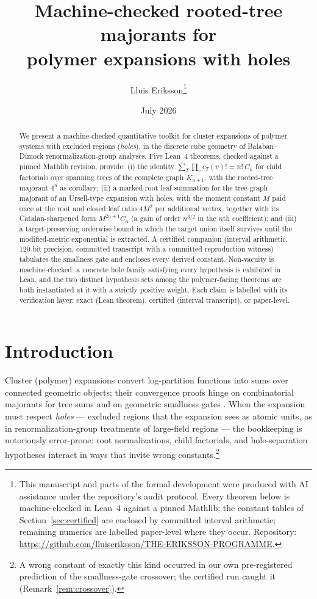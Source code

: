 \documentclass[11pt]{article}
\title{Machine-checked rooted-tree majorants for\\
polymer expansions with holes}
\author{Lluis Eriksson\thanks{This manuscript and parts of the
formal development were produced with AI assistance under the
repository's audit protocol.  Every theorem below is machine-checked
in Lean~4 against a pinned Mathlib; the constant tables of
Section~\ref{sec:certified} are enclosed by committed interval
arithmetic; remaining numerics are labelled paper-level where they
occur.  Repository:
\url{https://github.com/lluiseriksson/THE-ERIKSSON-PROGRAMME}.}}
\date{July 2026}
\begin{document}
\maketitle

\begin{abstract}
We present a machine-checked quantitative toolkit for cluster
expansions of polymer systems with excluded regions
(\emph{holes}), in the discrete cube geometry of Balaban--Dimock
renormalization-group analyses.  Five Lean~4 theorems, checked
against a pinned Mathlib revision, provide:
(i) the identity $\sum_{T} \prod_v c_T(v)! = n!\,C_n$
for child factorials over spanning trees of the complete graph
$K_{n+1}$, with the rooted-tree majorant $4^n$ as corollary;
(ii) a marked-root leaf summation for the tree-graph majorant of an
Ursell-type expansion with holes, with the moment constant $M$ paid
once at the root and closed leaf ratio $4M^2$ per additional vertex,
together with its Catalan-sharpened form $M^{2n+1} C_n$ (a gain of
order $n^{3/2}$ in the $n$th coefficient); and
(iii) a target-preserving orderwise bound in which the target
union itself survives until the modified-metric exponential is
extracted.
A certified companion (interval arithmetic, 120-bit precision,
committed transcript with a committed reproduction witness) tabulates
the smallness gate and encloses every derived constant.  Non-vacuity
is machine-checked: a concrete hole family satisfying every
hypothesis is exhibited in Lean, and the two distinct hypothesis sets
among the polymer-facing theorems are both instantiated at it with a
strictly positive weight.  Each claim is labelled with its
verification layer: exact (Lean theorem), certified (interval
transcript), or paper-level.
\end{abstract}

\section{Introduction}

Cluster (polymer) expansions convert log-partition functions into
sums over connected geometric objects; their convergence proofs hinge
on combinatorial majorants for tree sums and on geometric smallness
gates \cite{KP86,FP07,Brydges86}.  When the expansion must respect
\emph{holes} --- excluded regions that the expansion sees as atomic
units, as in renormalization-group treatments of large-field regions
\cite{Balaban87,DimockII} --- the bookkeeping is notoriously
error-prone: root normalizations, child factorials, and
hole-separation hypotheses interact in ways that invite wrong
constants.\footnote{A wrong constant of exactly this kind occurred in
our own pre-registered prediction of the smallness-gate crossover;
the certified run caught it (Remark~\ref{rem:crossover}).}
\end{document}
